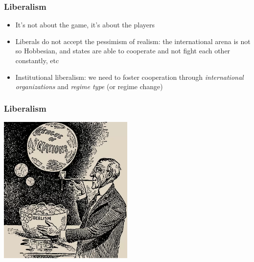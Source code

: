 \documentclass[aspectratio=43]{beamer}
\begin{document}
\begin{frame}
\frametitle{Liberalism}
\centering

\begin{itemize}[<+->]
  \item It's not about the game, it's about the players
  \item Liberals do not accept the pessimism of realism: the international arena is not so Hobbesian, and states are able to cooperate and not fight each other constantly, etc
  \item Institutional liberalism: we need to foster cooperation through \textit{international organizations} and \textit{regime type} (or regime change)
\end{itemize}

\end{frame}

\begin{frame}
\frametitle{Liberalism}
\centering

\includegraphics[width = 0.5\textwidth]{img/wwilson}

\end{frame}
\end{document}
